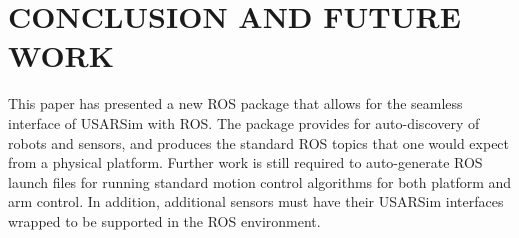 \section*{CONCLUSION AND FUTURE WORK}\label{s:conclusion}
This paper has presented a new ROS package that allows for the seamless interface of USARSim with ROS. The package provides for auto-discovery of robots and sensors, and produces the standard ROS topics that one would expect from a physical platform. Further work is still required to auto-generate ROS launch files for running standard motion control algorithms for both platform and arm control. In addition, additional sensors must have their USARSim interfaces wrapped to be supported in the ROS environment.
